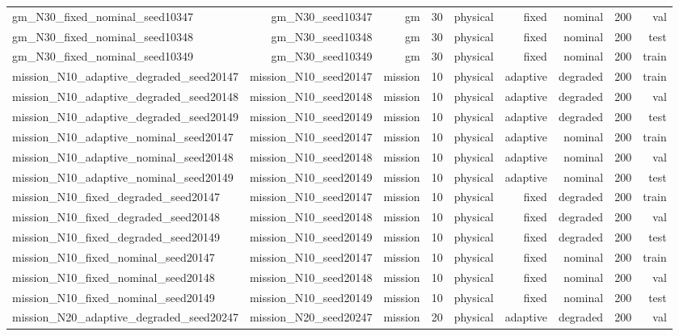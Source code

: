 \begin{tabular}{lrrrrrrrr}
gm\_N30\_fixed\_nominal\_seed10347 & gm\_N30\_seed10347 & gm & 30 & physical & fixed & nominal & 200 & val \\
gm\_N30\_fixed\_nominal\_seed10348 & gm\_N30\_seed10348 & gm & 30 & physical & fixed & nominal & 200 & test \\
gm\_N30\_fixed\_nominal\_seed10349 & gm\_N30\_seed10349 & gm & 30 & physical & fixed & nominal & 200 & train \\
mission\_N10\_adaptive\_degraded\_seed20147 & mission\_N10\_seed20147 & mission & 10 & physical & adaptive & degraded & 200 & train \\
mission\_N10\_adaptive\_degraded\_seed20148 & mission\_N10\_seed20148 & mission & 10 & physical & adaptive & degraded & 200 & val \\
mission\_N10\_adaptive\_degraded\_seed20149 & mission\_N10\_seed20149 & mission & 10 & physical & adaptive & degraded & 200 & test \\
mission\_N10\_adaptive\_nominal\_seed20147 & mission\_N10\_seed20147 & mission & 10 & physical & adaptive & nominal & 200 & train \\
mission\_N10\_adaptive\_nominal\_seed20148 & mission\_N10\_seed20148 & mission & 10 & physical & adaptive & nominal & 200 & val \\
mission\_N10\_adaptive\_nominal\_seed20149 & mission\_N10\_seed20149 & mission & 10 & physical & adaptive & nominal & 200 & test \\
mission\_N10\_fixed\_degraded\_seed20147 & mission\_N10\_seed20147 & mission & 10 & physical & fixed & degraded & 200 & train \\
mission\_N10\_fixed\_degraded\_seed20148 & mission\_N10\_seed20148 & mission & 10 & physical & fixed & degraded & 200 & val \\
mission\_N10\_fixed\_degraded\_seed20149 & mission\_N10\_seed20149 & mission & 10 & physical & fixed & degraded & 200 & test \\
mission\_N10\_fixed\_nominal\_seed20147 & mission\_N10\_seed20147 & mission & 10 & physical & fixed & nominal & 200 & train \\
mission\_N10\_fixed\_nominal\_seed20148 & mission\_N10\_seed20148 & mission & 10 & physical & fixed & nominal & 200 & val \\
mission\_N10\_fixed\_nominal\_seed20149 & mission\_N10\_seed20149 & mission & 10 & physical & fixed & nominal & 200 & test \\
mission\_N20\_adaptive\_degraded\_seed20247 & mission\_N20\_seed20247 & mission & 20 & physical & adaptive & degraded & 200 & val \\

\end{tabular}
